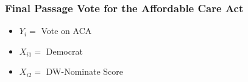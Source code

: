 \documentclass{beamer}
\begin{document}
\begin{frame}
\frametitle{Final Passage Vote for the Affordable Care Act}

\begin{itemize}
\item[] $Y_{i} = $ Vote on ACA 
\item[] $X_{i1} = $ Democrat
\item[] $X_{i2} = $ DW-Nominate Score
\end{itemize}

\pause 

\pause 




\end{frame}
\end{document}
